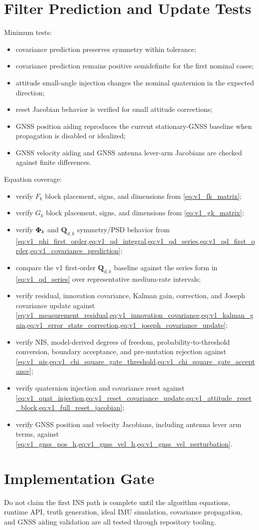 \section{Filter Prediction and Update Tests}

Minimum tests:
\begin{itemize}
    \item covariance prediction preserves symmetry within tolerance;
    \item covariance prediction remains positive semidefinite for the first
    nominal cases;
    \item attitude small-angle injection changes the nominal quaternion in the
    expected direction;
    \item reset Jacobian behavior is verified for small attitude corrections;
    \item GNSS position aiding reproduces the current stationary-GNSS baseline
    when propagation is disabled or idealized;
    \item GNSS velocity aiding and GNSS antenna lever-arm Jacobians are checked
    against finite differences.
\end{itemize}

Equation coverage:
\begin{itemize}
    \item verify $F_k$ block placement, signs, and dimensions from
    \cref{eq:v1_fk_matrix};
    \item verify $G_k$ block placement, signs, and dimensions from
    \cref{eq:v1_gk_matrix};
    \item verify $\boldsymbol{\Phi}_k$ and $\mathbf{Q}_{d,k}$ symmetry/PSD behavior from
    \cref{eq:v1_phi_first_order,eq:v1_qd_integral,eq:v1_qd_series,eq:v1_qd_first_order,eq:v1_covariance_prediction};
    \item compare the v1 first-order $\mathbf{Q}_{d,k}$ baseline against the
    series form in \cref{eq:v1_qd_series} over representative medium-rate
    intervals;
    \item verify residual, innovation covariance, Kalman gain, correction, and
    Joseph covariance update against
    \cref{eq:v1_measurement_residual,eq:v1_innovation_covariance,eq:v1_kalman_gain,eq:v1_error_state_correction,eq:v1_joseph_covariance_update};
    \item verify NIS, model-derived degrees of freedom, probability-to-threshold
    conversion, boundary acceptance, and pre-mutation rejection against
    \cref{eq:v1_nis,eq:v1_chi_square_gate_threshold,eq:v1_chi_square_gate_acceptance};
    \item verify quaternion injection and covariance reset against
    \cref{eq:v1_quat_injection,eq:v1_reset_covariance_update,eq:v1_attitude_reset_block,eq:v1_full_reset_jacobian};
    \item verify GNSS position and velocity Jacobians, including antenna lever
    arm terms, against
    \cref{eq:v1_gnss_pos_h,eq:v1_gnss_vel_h,eq:v1_gnss_vel_perturbation}.
\end{itemize}

\section{Implementation Gate}

\begin{implbox}
Do not claim the first INS path is complete until the algorithm equations,
runtime API, truth generation, ideal IMU simulation, covariance propagation, and
GNSS aiding validation are all tested through repository tooling.
\end{implbox}
